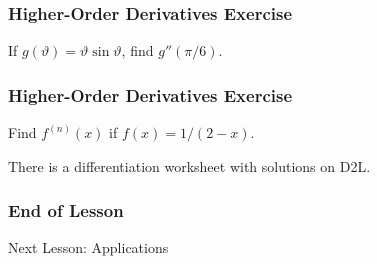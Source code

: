 \documentclass[xcolor=dvipsnames]{beamer}
\begin{document}
\begin{frame}
  \frametitle{Higher-Order Derivatives Exercise}
{\ubung} If $g(\vartheta)=\vartheta\sin\vartheta$, find $g''(\pi/6)$.
\end{frame}

\begin{frame}
  \frametitle{Higher-Order Derivatives Exercise}
{\ubung} Find $f^{(n)}(x)$ if $f(x)=1/(2-x)$.

\bigskip

There is a differentiation worksheet with solutions on D2L.
\end{frame}

\begin{frame}
  \frametitle{End of Lesson}
Next Lesson: Applications
\end{frame}
\end{document}
